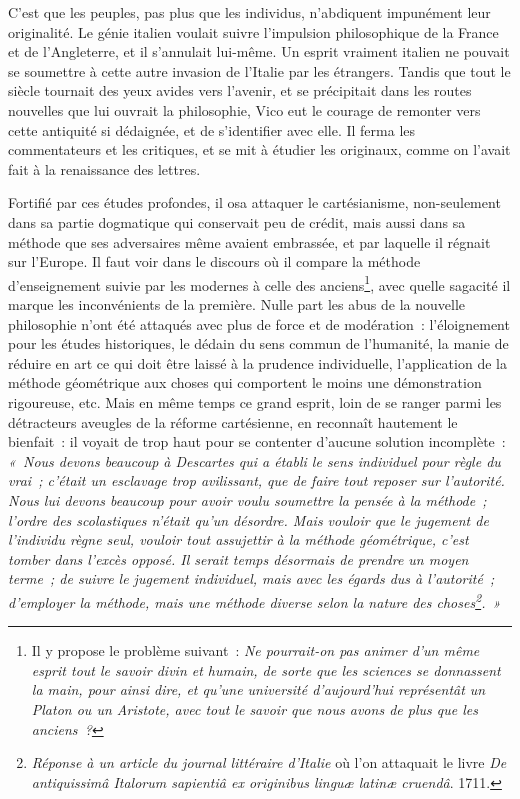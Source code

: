 \documentclass[french,twoside]{book} %
\begin{document}
\noindent C’est que les peuples, pas plus que les individus, n’abdiquent impunément leur originalité. Le génie italien voulait suivre l’impulsion philosophique de la France et de l’Angleterre, et il s’annulait lui-même. Un esprit vraiment italien ne pouvait se soumettre à cette autre invasion de l’Italie par les étrangers. Tandis que tout le siècle tournait des yeux avides vers l’avenir, et se précipitait dans les routes nouvelles que lui ouvrait la philosophie, Vico eut le courage de remonter vers cette antiquité si dédaignée, et de s’identifier avec elle. Il ferma les commentateurs et les critiques, et se mit à étudier les originaux, comme on l’avait fait à la renaissance des lettres.\par
Fortifié par ces études profondes, il osa attaquer le cartésianisme, non-seulement dans sa partie dogmatique qui conservait peu de crédit, mais aussi dans sa méthode que ses adversaires même avaient embrassée, et par laquelle il régnait sur l’Europe. Il faut voir dans le discours où il compare la méthode d’enseignement suivie par les  modernes à celle des anciens\footnote{Il y propose le problème suivant : \emph{{\itshape Ne pourrait-on pas animer d’un même esprit tout le savoir divin et humain, de sorte que les sciences se donnassent la main, pour ainsi dire, et qu’une université d’aujourd’hui représentât un Platon ou un Aristote, avec tout le savoir que nous avons de plus que les anciens} ?}}, avec quelle sagacité il marque les inconvénients de la première. Nulle part les abus de la nouvelle philosophie n’ont été attaqués avec plus de force et de modération : l’éloignement pour les études historiques, le dédain du sens commun de l’humanité, la manie de réduire en art ce qui doit être laissé à la prudence individuelle, l’application de la méthode géométrique aux choses qui comportent le moins une démonstration rigoureuse, etc. Mais en même temps ce grand esprit, loin de se ranger parmi les détracteurs aveugles de la réforme cartésienne, en reconnaît hautement le bienfait : il voyait de trop haut pour se contenter d’aucune solution incomplète : \emph{« Nous devons beaucoup à Descartes qui a établi le sens individuel pour règle du vrai ; c’était un esclavage trop avilissant, que de faire tout reposer sur l’autorité. Nous lui devons beaucoup pour avoir voulu soumettre la pensée à la méthode ; l’ordre des scolastiques n’était qu’un désordre. Mais vouloir que le jugement de l’individu règne seul, vouloir tout assujettir à la méthode géométrique, c’est tomber dans l’excès opposé. Il serait temps  désormais de prendre un moyen terme ; de suivre le jugement individuel, mais avec les égards dus à l’autorité ; d’employer la méthode, mais une méthode diverse selon la nature des choses\footnote{{\itshape Réponse à un article du journal littéraire d’Italie} où l’on attaquait le livre {\itshape De antiquissimâ Italorum sapientiâ ex originibus linguæ latinæ cruendâ}. 1711.}. »}\par
\end{document}
